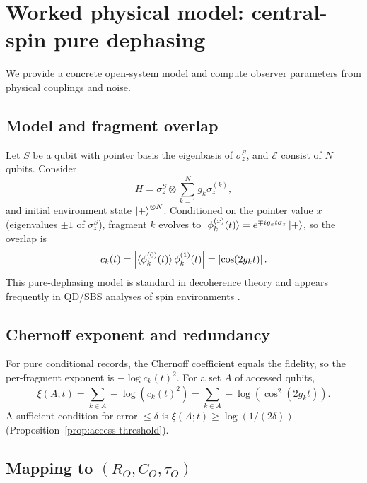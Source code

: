 \documentclass[aps,pra,twocolumn,superscriptaddress,nofootinbib]{revtex4-2}
\newcommand{\cE}{\mathcal{E}}
\newcommand{\1}{\mathbf{1}}
\newcommand{\QCBdist}{\xi}
\theoremstyle{definition}
\theoremstyle{plain}
\begin{document}
\section{Worked physical model: central-spin pure dephasing}
\label{sec:centralspin}

We provide a concrete open-system model and compute observer parameters from physical couplings and noise.

\subsection{Model and fragment overlap}

Let $S$ be a qubit with pointer basis the eigenbasis of $\sigma_z^S$, and $\cE$ consist of $N$ qubits.
Consider
\begin{equation}
H = \sigma_z^S \otimes \sum_{k=1}^N g_k \sigma_z^{(k)},
\label{eq:centralspin-H}
\end{equation}
and initial environment state $\ket{+}^{\otimes N}$.
Conditioned on the pointer value $x$ (eigenvalues $\pm 1$ of $\sigma_z^S$), fragment $k$ evolves to
$\ket{\phi_k^{(x)}(t)} = e^{\mp i g_k t \sigma_z}\ket{+}$,
so the overlap is
\begin{equation}
 c_k(t)=\left|\braket{\phi_k^{(0)}(t)}{\phi_k^{(1)}(t)}\right|=\left|\cos(2 g_k t)\right|.
\label{eq:ck}
\end{equation}
This pure-dephasing model is standard in decoherence theory and appears frequently in QD/SBS analyses of spin environments \cite{KorbiczReview2021,RoszakKorbicz2019,ZwolakRiedelZurek2016}.

\subsection{Chernoff exponent and redundancy}

For pure conditional records, the Chernoff coefficient equals the fidelity, so the per-fragment exponent is $-\log c_k(t)^2$.
For a set $A$ of accessed qubits,
\begin{equation}
\QCBdist(A;t)=\sum_{k\in A} -\log\!\left(c_k(t)^2\right)
=\sum_{k\in A} -\log\!\left(\cos^2(2 g_k t)\right).
\label{eq:xi-centralspin}
\end{equation}
A sufficient condition for error $\le\delta$ is $\QCBdist(A;t)\ge \log(1/(2\delta))$ (Proposition~\ref{prop:access-threshold}).

\subsection{Mapping to $(R_O,C_O,\tau_O)$}
\end{document}
